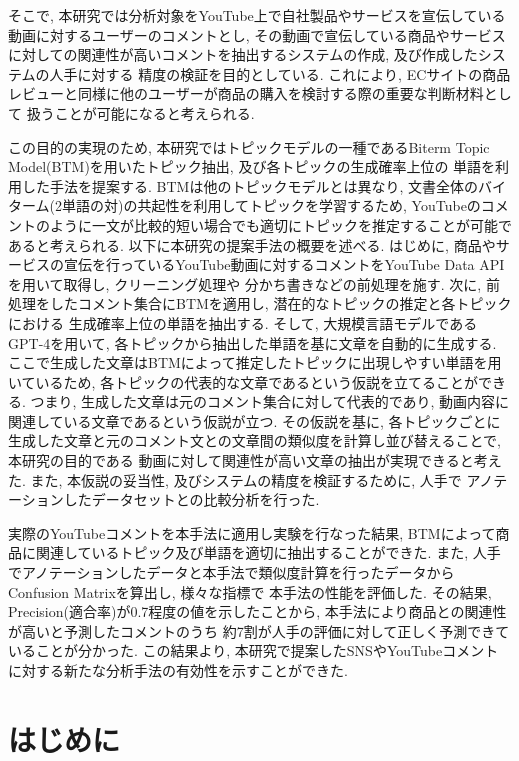 \documentclass{ltjarticle}
\begin{document}
そこで, 本研究では分析対象をYouTube上で自社製品やサービスを宣伝している動画に対するユーザーのコメントとし, 
その動画で宣伝している商品やサービスに対しての関連性が高いコメントを抽出するシステムの作成, 及び作成したシステムの人手に対する
精度の検証を目的としている. これにより, ECサイトの商品レビューと同様に他のユーザーが商品の購入を検討する際の重要な判断材料として
扱うことが可能になると考えられる. 

この目的の実現のため, 本研究ではトピックモデルの一種であるBiterm Topic Model(BTM)を用いたトピック抽出, 及び各トピックの生成確率上位の
単語を利用した手法を提案する. BTMは他のトピックモデルとは異なり, 文書全体のバイターム(2単語の対)の共起性を利用してトピックを学習するため, 
YouTubeのコメントのように一文が比較的短い場合でも適切にトピックを推定することが可能であると考えられる. 
以下に本研究の提案手法の概要を述べる. 
はじめに, 商品やサービスの宣伝を行っているYouTube動画に対するコメントをYouTube Data APIを用いて取得し, クリーニング処理や
分かち書きなどの前処理を施す. 次に, 前処理をしたコメント集合にBTMを適用し, 潜在的なトピックの推定と各トピックにおける
生成確率上位の単語を抽出する. そして, 大規模言語モデルであるGPT-4を用いて, 各トピックから抽出した単語を基に文章を自動的に生成する. 
ここで生成した文章はBTMによって推定したトピックに出現しやすい単語を用いているため, 各トピックの代表的な文章であるという仮説を立てることができる. 
つまり, 生成した文章は元のコメント集合に対して代表的であり, 動画内容に関連している文章であるという仮説が立つ. 
その仮説を基に, 各トピックごとに生成した文章と元のコメント文との文章間の類似度を計算し並び替えることで, 本研究の目的である
動画に対して関連性が高い文章の抽出が実現できると考えた. また, 本仮説の妥当性, 及びシステムの精度を検証するために, 人手で
アノテーションしたデータセットとの比較分析を行った. 

実際のYouTubeコメントを本手法に適用し実験を行なった結果, BTMによって商品に関連しているトピック及び単語を適切に抽出することができた. 
また, 人手でアノテーションしたデータと本手法で類似度計算を行ったデータからConfusion Matrixを算出し, 様々な指標で
本手法の性能を評価した. その結果, Precision(適合率)が0.7程度の値を示したことから, 本手法により商品との関連性が高いと予測したコメントのうち
約7割が人手の評価に対して正しく予測できていることが分かった. 
この結果より, 本研究で提案したSNSやYouTubeコメントに対する新たな分析手法の有効性を示すことができた. 


\newpage
\tableofcontents
\clearpage

\part{はじめに}
\vspace{10truept}
\end{document}
